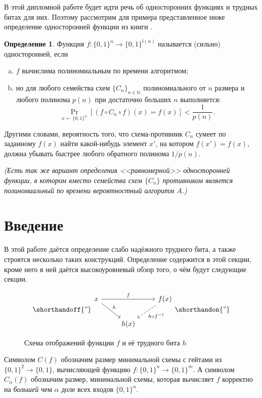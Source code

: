 \documentclass[oneside, a4paper]{article}
\theoremstyle{definition}
\newtheorem{definition}{Определение}
\theoremstyle{remark}
\begin{document}
В этой дипломной работе будет идти речь об односторонних функциях и трудных
битах для них. Поэтому рассмотрим для примера представленное ниже определение
односторонней функции из книги \cite[гл. 2]{goldreich}.

\begin{definition}
Функция $f : \{0, 1\}^n \to \{0, 1\}^{l(n)}$ называется (сильно) односторонней,
если
\begin{enumerate}[(a)]
\item $f$ вычислима полиномиальным по времени алгоритмом;
\item но для любого семейства схем $\{ C_n \}_{n \in \mathbb N}$ полиномиального
от $n$ размера и любого полинома $p(n)$ при достаточно больших $n$ выполняется:
\[
\Pr_{x \gets \{0, 1\}^n}[(f \circ C_n \circ f)(x) = f(x)] < \frac 1 {p(n)}.
\]
\end{enumerate}

Другими словами, вероятность того, что схема-противник $C_n$ сумеет по заданному
$f(x)$ найти какой-нибудь элемент $x'$, на котором $f(x') = f(x)$, должна
убывать быстрее любого обратного полинома $1 / p(n)$.

\emph{(Есть так же вариант определения <<равномерной>> односторонней функции, в
котором вместо семейства схем $\{C_n\}$ противником является полиномиальный по
времени вероятностный алгоритм $A$.)}
\end{definition}


\section{Введение}

В этой работе даётся определение слабо надёжного трудного бита, а также
строятся несколько таких конструкций. Определение содержится в этой секции,
кроме него в ней даётся высокоуровневый обзор того, о чём будут следующие
секции.

\begin{figure}[h]
\[
\shorthandoff{"}
\begin{tikzcd}
x \arrow[rr, "f"] \arrow[rd, "h"] & ~ & f(x) \arrow[ld, dashrightarrow, "h \circ f^{-1}"] \\
~ & h(x) & ~
\end{tikzcd}
\shorthandon{"}
\]
\caption{Схема отображений функции $f$ и её трудного бита $h$}
\end{figure}


Символом $C(f)$ обозначим размер минимальной схемы с гейтами из $\{0, 1\}^2 \to
\{0, 1\}$, вычисляющей функцию $f : \{0, 1\}^n \to \{0, 1\}^m$. А символом
$C_\alpha(f)$ обозначим размер, минимальной схемы, которая вычисляет $f$
корректно на \emph{большей} чем $\alpha$ доле всех входов $\{0, 1\}^n$.
\end{document}

